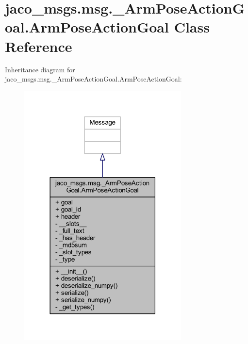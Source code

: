 \hypertarget{classjaco__msgs_1_1msg_1_1__ArmPoseActionGoal_1_1ArmPoseActionGoal}{}\section{jaco\+\_\+msgs.\+msg.\+\_\+\+Arm\+Pose\+Action\+Goal.\+Arm\+Pose\+Action\+Goal Class Reference}
\label{classjaco__msgs_1_1msg_1_1__ArmPoseActionGoal_1_1ArmPoseActionGoal}


Inheritance diagram for jaco\+\_\+msgs.\+msg.\+\_\+\+Arm\+Pose\+Action\+Goal.\+Arm\+Pose\+Action\+Goal\+:
\nopagebreak
\begin{figure}[H]
\begin{center}
\leavevmode
\includegraphics[width=242pt]{da/d4b/classjaco__msgs_1_1msg_1_1__ArmPoseActionGoal_1_1ArmPoseActionGoal__inherit__graph}
\end{center}
\end{figure}


